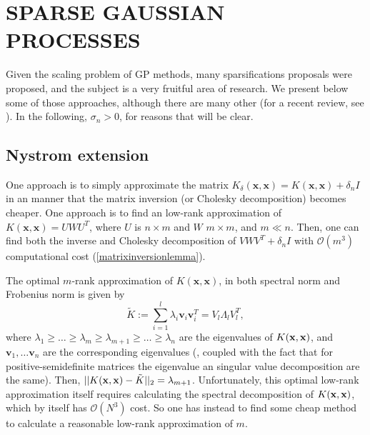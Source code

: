 




\chapter{SPARSE GAUSSIAN PROCESSES}\label{sparsegpchapter}

Given the scaling problem of GP methods, many sparsifications proposals were proposed, and the subject is a very fruitful area of research. We present below some of those approaches, although there are many other (for a recent review, see \cite{Haitao_2018}). In the following, $\sigma_n > 0$, for reasons that will be clear.

\section{Nystrom extension}
One approach is to simply approximate the matrix $K_\delta(\mathbf{x},\mathbf{x}) = K(\mathbf{x},\mathbf{x}) + \delta_n I$ in an manner that the matrix inversion (or Cholesky decomposition) becomes cheaper. One approach is to find an low-rank approximation of $K(\mathbf{x},\mathbf{x}) = U W U^T$, where $U$ is $n \times m$ and $W$ $m \times m$, and $m \ll n$. Then, one can find both the inverse and Cholesky decomposition of $V W V^T + \delta_n I$ with $\mathcal{O}(m^3)$ computational cost (\ref{matrixinversionlemma}).

The optimal $m$-rank approximation of $K(\mathbf{x},\mathbf{x})$, in both spectral norm and Frobenius norm is given by
\begin{displaymath}
\tilde{K} := \sum_{i=1}^l \lambda_i \mathbf{v}_i \mathbf{v}_i^T = V_l \Lambda_l V_l^T,
\end{displaymath} 
where $\lambda_1 \geq \ldots \geq \lambda_m \geq \lambda_{m+1} \geq \ldots \geq \lambda_n$ are the eigenvalues of $K({\mathbf x},{\mathbf x})$, and $\mathbf{v}_1,\ldots \mathbf{v}_n$ are the corresponding eigenvalues (\cite{Eckart_1936}, coupled with the fact that for positive-semidefinite matrices the eigenvalue an singular value decomposition are the same). Then, $||K({\mathbf x},{\mathbf x}) - \tilde{K}||_2 = \lambda_{m+1}$. Unfortunately, this optimal low-rank approximation itself requires calculating the spectral decomposition of $K({\mathbf x},{\mathbf x})$, which by itself has $\mathcal{O}(N^3)$ cost. So one has instead to find some cheap method to calculate a reasonable low-rank approximation of $m$.

